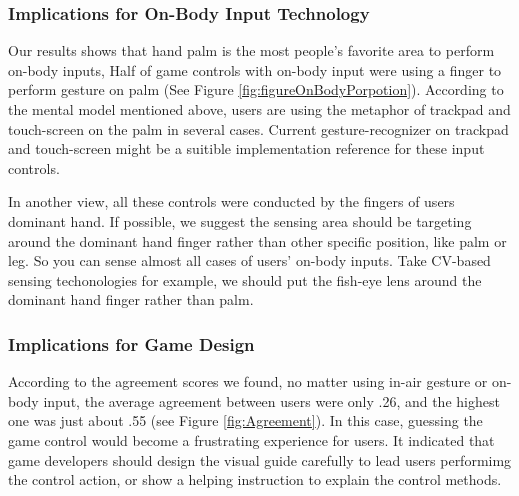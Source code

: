 \documentclass{sigchi}
\begin{document}
  \subsubsection{Implications for On-Body Input Technology}
    Our results shows that hand palm is the most people's favorite area to perform on-body inputs,
    Half of game controls with on-body input were using a finger to perform gesture on palm (See Figure \ref{fig:figureOnBodyPorpotion}). According to the mental model mentioned above, users are using the metaphor of trackpad and touch-screen on the palm in several cases. Current gesture-recognizer on trackpad and touch-screen might be a suitible implementation reference for these input controls.

    In another view, all these controls were conducted by the fingers of users dominant hand. If possible, we suggest the sensing area should be targeting around the dominant hand finger rather than other specific position, like palm or leg. So you can sense almost all cases of users' on-body inputs. Take CV-based sensing techonologies for example, we should put the fish-eye lens around the dominant hand finger rather than palm.



  \subsubsection{Implications for Game Design}
  According to the agreement scores we found, no matter using in-air gesture or on-body input, the average agreement between users were only .26, and the highest one was just about .55 (see Figure \ref{fig:Agreement}). In this case, guessing the game control would become a frustrating experience for users. It indicated that game developers should design the visual guide carefully to lead users performimg the control action, or show a helping instruction to explain the control methods.
\end{document}
